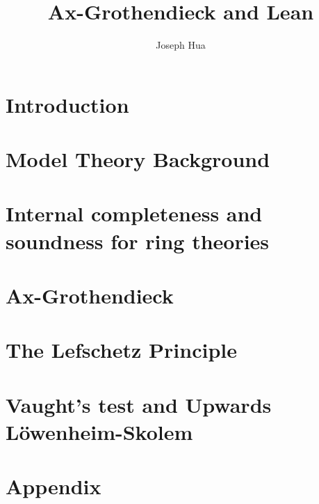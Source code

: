 \documentclass{article}
\newcommand{\<}{\langle}
\renewcommand{\>}{\rangle}
\theoremstyle{definitionstyle}
\theoremstyle{exercisestyle}
\theoremstyle{remarkstyle}
\begin{document}
\title{Ax-Grothendieck and Lean}
\author{Joseph Hua}
\maketitle

\tableofcontents

\newpage
\section{Introduction}



\section{Model Theory Background}


\section{Internal completeness and soundness for ring theories}


\section{Ax-Grothendieck}



\section{The Lefschetz Principle}


\section{Vaught's test and Upwards L\"{o}wenheim-Skolem}


\section{Appendix}


{}

\end{document}

